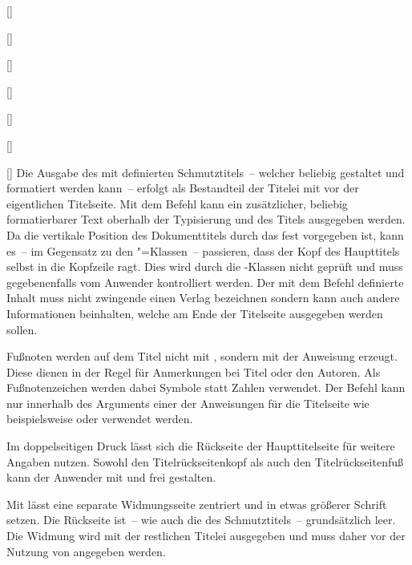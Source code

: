 \begin{Declaration*}{}
\begin{Declaration*}{}
\begin{Declaration*}{}
\begin{Declaration}{[]}
\begin{Declaration}{[]}
\begin{Declaration}{[]}
\begin{Declaration}{[]}
\begin{Declaration}{[]}
\begin{Declaration}{[]}
\begin{Declaration}{[]}
Die Ausgabe des mit  definierten Schmutztitels~-- welcher 
beliebig gestaltet und formatiert werden kann~-- erfolgt als Bestandteil der 
Titelei mit  vor der eigentlichen Titelseite. Mit dem Befehl 
 kann ein zusätzlicher, beliebig formatierbarer Text oberhalb 
der Typisierung und des Titels ausgegeben werden. Da die vertikale Position des 
Dokumenttitels durch das \CD fest vorgegeben ist, kann es~-- im Gegensatz zu 
den \KOMAScript"=Klassen~-- passieren, dass der Kopf des Haupttitels selbst in 
die Kopfzeile ragt. Dies wird durch die \TUDScript-Klassen nicht geprüft und 
muss gegebenenfalls vom Anwender kontrolliert werden. Der mit dem Befehl 
 definierte Inhalt muss nicht zwingende einen Verlag 
bezeichnen sondern kann auch andere Informationen beinhalten, welche am Ende 
der Titelseite ausgegeben werden sollen.

Fußnoten werden auf dem Titel nicht mit , sondern mit der 
Anweisung  erzeugt. Diese dienen in der Regel für Anmerkungen bei 
Titel oder den Autoren. Als Fußnotenzeichen werden dabei Symbole statt Zahlen 
verwendet. Der Befehl  kann nur innerhalb des Arguments einer 
der Anweisungen für die Titelseite wie beispielsweise  oder 
 verwendet werden.

%
Im doppelseitigen Druck lässt sich die Rückseite der Haupttitelseite für 
weitere Angaben nutzen. Sowohl den Titelrückseitenkopf als auch den
Titelrückseitenfuß kann der Anwender mit  und 
 frei gestalten.

Mit  lässt eine separate Widmungsseite zentriert und in etwas 
größerer Schrift setzen. Die Rückseite ist~-- wie auch die des Schmutztitels~-- 
grundsätzlich leer. Die Widmung wird mit der restlichen Titelei ausgegeben und 
muss daher vor der Nutzung von  angegeben werden.
%
\end{Declaration}
\end{Declaration}
\end{Declaration}
\end{Declaration}
\end{Declaration}
\end{Declaration}
\end{Declaration}



\end{Declaration*}
\end{Declaration*}
\end{Declaration*}
